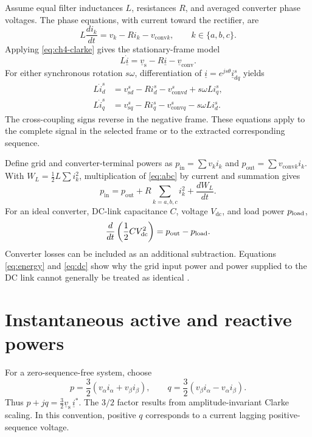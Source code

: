 Assume equal filter inductances \(L\), resistances \(R\), and averaged converter phase voltages. The phase equations, with current toward the rectifier, are
\begin{equation}\label{eq:abc}
L\frac{di_k}{dt}=v_k-Ri_k-v_{\mathrm{conv}k},\qquad k\in\{a,b,c\}.
\end{equation}
Applying \eqref{eq:ch4-clarke} gives the stationary-frame model
\begin{equation}\label{eq:model}
L\dot{\underline i}=\underline v_{\mathrm{s}}-R\underline i-\underline v_{\mathrm{conv}}.
\end{equation}
For either synchronous rotation \(s\omega\), differentiation of \(\underline i=e^{js\theta}\underline i_{dq}^s\) yields
\begin{equation}\label{eq:dqmodel}
\begin{aligned}
L\dot i_d^s&=v_{\mathrm{s}d}^s-Ri_d^s-v_{\mathrm{conv}d}^s+s\omega L i_q^s,\\
L\dot i_q^s&=v_{\mathrm{s}q}^s-Ri_q^s-v_{\mathrm{conv}q}^s-s\omega L i_d^s.
\end{aligned}
\end{equation}
The cross-coupling signs reverse in the negative frame. These equations apply to the complete signal in the selected frame or to the extracted corresponding sequence.

Define grid and converter-terminal powers as \(p_{\mathrm{in}}=\sum v_ki_k\) and \(p_{\mathrm{out}}=\sum v_{\mathrm{conv}k}i_k\). With \(W_L=\tfrac12L\sum i_k^2\), multiplication of \eqref{eq:abc} by current and summation gives
\begin{equation}\label{eq:energy}
p_{\mathrm{in}}=p_{\mathrm{out}}+R\sum_{k=a,b,c}i_k^2+\frac{dW_L}{dt}.
\end{equation}
For an ideal converter, DC-link capacitance \(C\), voltage \(V_{\mathrm{dc}}\), and load power \(p_{\rm load}\),
\begin{equation}\label{eq:dc}
\frac{d}{dt}\left(\frac12 CV_{\mathrm{dc}}^2\right)=p_{\mathrm{out}}-p_{\rm load}.
\end{equation}
Converter losses can be included as an additional subtraction. Equations \eqref{eq:energy} and \eqref{eq:dc} show why the grid input power and power supplied to the DC link cannot generally be treated as identical \cite{li2010journal}.

\section{Instantaneous active and reactive powers}
For a zero-sequence-free system, choose
\begin{equation}\label{eq:pq}
p=\frac32(v_\alpha i_\alpha+v_\beta i_\beta),\qquad
q=\frac32(v_\beta i_\alpha-v_\alpha i_\beta).
\end{equation}
Thus \(p+jq=\tfrac32\underline v_{\mathrm{s}}\,\underline i^*\). The \(3/2\) factor results from amplitude-invariant Clarke scaling. In this convention, positive \(q\) corresponds to a current lagging positive-sequence voltage.

